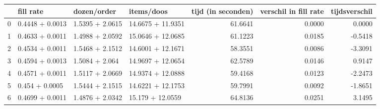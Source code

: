 \begin{tabular}{llllrrr}
\toprule
{} &        fill rate &      dozen/order &         items/doos &  tijd (in seconden) &  verschil in fill rate &  tijdsverschil \\
\midrule
0 &  0.4448 + 0.0013 &  1.5395 + 2.0615 &  14.6675 + 11.9351 &             61.6641 &                 0.0000 &         0.0000 \\
1 &  0.4633 + 0.0011 &  1.4988 + 2.0592 &  15.0646 + 12.0685 &             61.1223 &                 0.0185 &        -0.5418 \\
2 &  0.4534 + 0.0011 &  1.5468 + 2.1512 &  14.6001 + 12.1671 &             58.3551 &                 0.0086 &        -3.3091 \\
3 &  0.4594 + 0.0013 &   1.5084 + 2.064 &  14.9697 + 12.0654 &             62.5789 &                 0.0146 &         0.9147 \\
4 &  0.4571 + 0.0011 &  1.5117 + 2.0669 &  14.9374 + 12.0888 &             59.4168 &                 0.0123 &        -2.2473 \\
5 &   0.454 + 0.0005 &  1.5444 + 2.1515 &  14.6221 + 12.1753 &             59.7991 &                 0.0092 &        -1.8651 \\
6 &  0.4699 + 0.0011 &  1.4876 + 2.0342 &   15.179 + 12.0559 &             64.8136 &                 0.0251 &         3.1495 \\
\bottomrule
\end{tabular}
